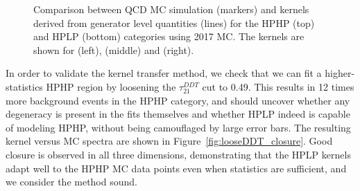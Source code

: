 \begin{figure}[h!]
\caption{Comparison between QCD MC simulation (markers) and kernels derived from generator level quantities (lines) for the HPHP (top) and HPLP (bottom) categories using 2017 MC. The kernels are shown for \MJO (left), \MJT (middle) and \MVV (right).}
\label{fig:3DkernelsHPHPpythia}
\end{figure}
In order to validate the kernel transfer method, we check that we can fit a higher-statistics HPHP region by loosening the $\tau_{21}^{DDT}$ cut to 0.49. This results in 12 times more background events in the HPHP category, and should uncover whether any degeneracy is present in the fits themselves and whether HPLP indeed is capable of modeling HPHP, without being camouflaged by large error bars. The resulting kernel versus MC spectra are shown in Figure~\ref{fig:looseDDT_closure}. Good closure is observed in all three dimensions, demonstrating that the HPLP kernels adapt well to the HPHP MC data points even when statistics are sufficient, and we consider the method sound.
